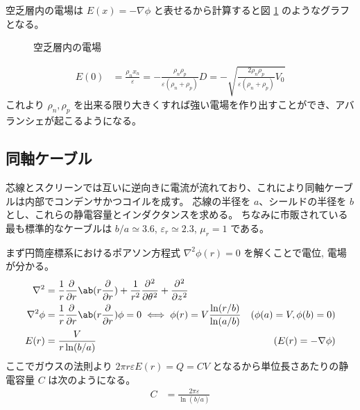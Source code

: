 \documentclass[uplatex,dvipdfmx,a4paper,11pt]{jlreq}
\numberwithin{equation}{section}
\theoremstyle{definition}
\begin{document}
空乏層内の電場は $E(x) = -\nabla \phi$ と表せるから計算すると図 \ref{fig:kubosou E} のようなグラフとなる。
\begin{figure}[htbp]
  \centering
  \caption{空乏層内の電場}
  \label{fig:kubosou E}
\end{figure}
\begin{align}
  E(0) & = \frac{\rho_nx_n}{\varepsilon} = -\frac{\rho_n\rho_p}{\varepsilon(\rho_n + \rho_p)}D = -\sqrt{\frac{2\rho_n\rho_p}{\varepsilon(\rho_n + \rho_p)}V_0}
\end{align}
これより $\rho_n, \rho_p$ を出来る限り大きくすれば強い電場を作り出すことができ、アバランシェが起こるようになる。


\subsection{同軸ケーブル}
芯線とスクリーンでは互いに逆向きに電流が流れており、これにより同軸ケーブルは内部でコンデンサかつコイルを成す。
芯線の半径を $a$、シールドの半径を $b$ とし、これらの静電容量とインダクタンスを求める。
ちなみに市販されている最も標準的なケーブルは $b/a \simeq 3.6$, $\varepsilon_r \simeq 2.3$, $\mu_r = 1$ である。

まず円筒座標系におけるポアソン方程式 $\nabla^2\phi(r) = 0$ を解くことで電位, 電場が分かる。
\begin{align}
  \nabla^2     & = \frac{1}{r}\diffp{}{r}\ab(r\diffp{}{r}) + \frac{1}{r^2}\diffp[2]{}{\theta} + \diffp[2]{}{z}                              \\
  \nabla^2\phi & = \frac{1}{r}\diffp{}{r}\ab(r\diffp{}{r})\phi = 0 \iff \phi(r) = V\frac{\ln(r/b)}{\ln(a/b)}   & (\phi(a) = V, \phi(b) = 0) \\
  E(r)         & = \frac{V}{r\ln(b/a)}                                                                         & (E(r) = -\nabla\phi)
\end{align}
ここでガウスの法則より $2\pi r\varepsilon E(r) = Q = CV$ となるから単位長さあたりの静電容量 $C$ は次のようになる。
\begin{align}
  C & = \frac{2\pi\varepsilon}{\ln(b/a)}
\end{align}
\end{document}
